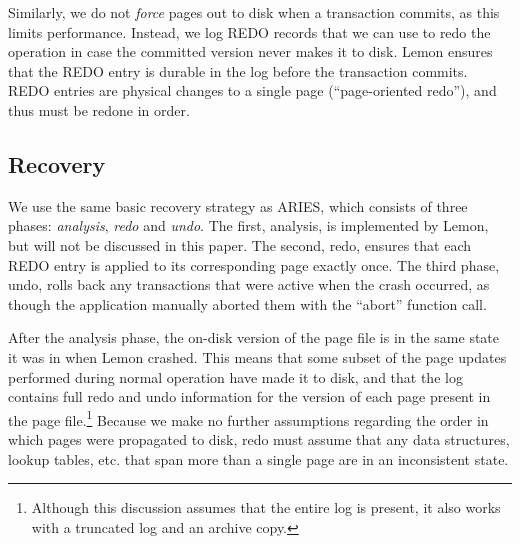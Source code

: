 \documentclass[10pt,letterpaper,twocolumn,english]{article}
\newcommand{\yad}{Lemon\xspace}
\begin{document}
Similarly, we do not {\em force} pages out to disk when a transaction
commits, as this limits performance.  Instead, we log REDO records
that we can use to redo the operation in case the committed version never
makes it to disk.  \yad ensures that the REDO entry is durable in the
log before the transaction commits.  REDO entries are physical changes
to a single page (``page-oriented redo''), and thus must be redone in
order. 





\subsection{Recovery}
\label{recovery}

%

We use the same basic recovery strategy as ARIES, which consists of
three phases: {\em analysis}, {\em redo} and {\em undo}.  The first,
analysis, is implemented by \yad, but will not be discussed in this
paper. The second, redo, ensures that each REDO entry is applied to
its corresponding page exactly once.  The third phase, undo, rolls
back any transactions that were active when the crash occurred, as
though the application manually aborted them with the ``abort''
function call.
  
After the analysis phase, the on-disk version of the page file is in
the same state it was in when \yad crashed. This means that some
subset of the page updates performed during normal operation have made
it to disk, and that the log contains full redo and undo information
for the version of each page present in the page
file.\footnote{Although this discussion assumes that the entire log is
present, it also works with a truncated log and an archive copy.}
Because we make no further assumptions regarding the order in which
pages were propagated to disk, redo must assume that any data
structures, lookup tables, etc. that span more than a single page are
in an inconsistent state. 
\end{document}
